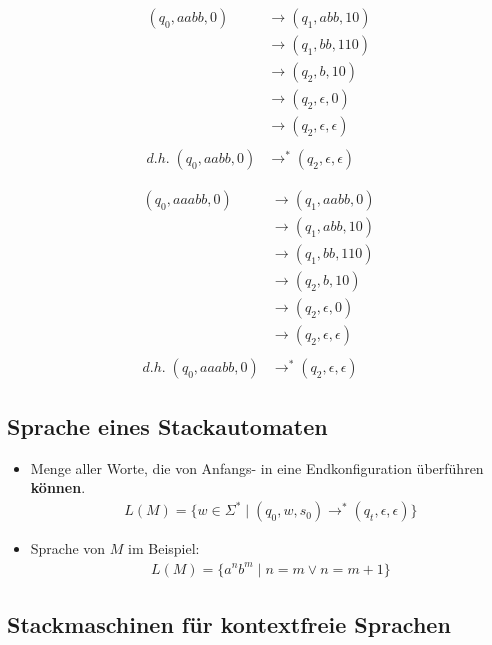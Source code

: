 \documentclass{scrartcl}
\begin{document}
\begin{minipage}{.5\linewidth}
\begin{align*}
	(q_0,aabb,0) &\rightarrow (q_1,abb,10) \\
	&\rightarrow (q_1,bb,110) \\
	&\rightarrow (q_2,b,10) \\
	&\rightarrow (q_2,\epsilon,0) \\
	&\rightarrow (q_2,\epsilon,\epsilon) \\\\
	d.h. \; (q_0,aabb,0) &\rightarrow^* (q_2,\epsilon,\epsilon)
\end{align*}
\end{minipage}
\begin{minipage}{.5\linewidth}
\begin{align*}
	(q_0,aaabb,0) &\rightarrow (q_1,aabb,0) \\
	&\rightarrow (q_1,abb,10) \\
	&\rightarrow (q_1,bb,110) \\
	&\rightarrow (q_2,b,10) \\
	&\rightarrow (q_2,\epsilon,0) \\
	&\rightarrow (q_2,\epsilon,\epsilon) \\\\
	d.h. \; (q_0,aaabb,0) &\rightarrow^* (q_2,\epsilon,\epsilon)
\end{align*}
\end{minipage}

\subsection{Sprache eines Stackautomaten}

\begin{itemize}
	\item Menge aller Worte, die von Anfangs- in eine Endkonfiguration überführen \textbf{können}.
	\begin{align*}
		L(M) = \{ w \in \Sigma^* \mid (q_0,w,s_0) \rightarrow^* (q_t,\epsilon,\epsilon) \}
	\end{align*}
	\item Sprache von $M$ im Beispiel:
	\begin{align*}
		L(M) = \{ a^n b^m \mid n = m \vee n = m + 1 \}
	\end{align*}
\end{itemize}

\subsection{Stackmaschinen für kontextfreie Sprachen}
\end{document}
